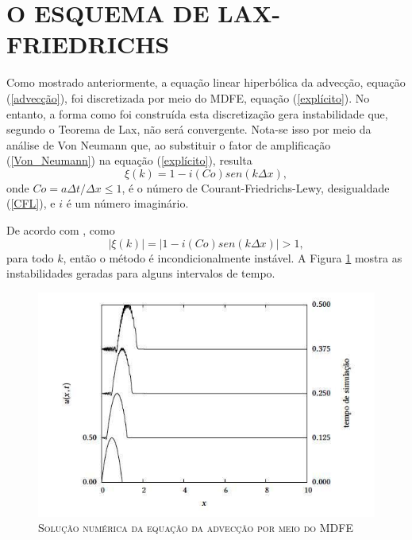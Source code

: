 \section{O ESQUEMA DE LAX-FRIEDRICHS} \label{Lax_Fri}

Como mostrado anteriormente, a equação linear hiperbólica da advecção, equação (\ref{advecção}), foi discretizada por meio do MDFE, equação (\ref{explícito}). No entanto, a forma como foi construída esta discretização gera instabilidade que, segundo o Teorema de Lax, não será convergente. Nota-se isso por meio da análise de Von Neumann que, ao substituir o fator de amplificação (\ref{Von_Neumann}) na equação (\ref{explícito}), resulta
\begin{equation} \label{instabi}
\xi (k) = 1-i(Co)sen(k \Delta x),
\end{equation}
onde $ Co = {a \Delta t}/{ \Delta x} \leq 1$, é o número de Courant-Friedrichs-Lewy, desigualdade (\ref{CFL}), e $i$ é um número imaginário.

De acordo com , como 
\begin{equation}
| \xi (k)| = |1-i(Co)sen(k \Delta x)| >1,
\end{equation}
para todo $k$, então o método é incondicionalmente instável. A Figura \ref{fig:Dias_A} mostra as instabilidades geradas para alguns intervalos de tempo.

\begin{figure}[H]
	\centering
	\includegraphics[scale=1]{figuras/Dias_A.jpg}
	\caption{\textsc{Solução numérica da equação da advecção por meio do MDFE}}
	\vspace{-0.1cm}
	\label{fig:Dias_A}
\end{figure}


